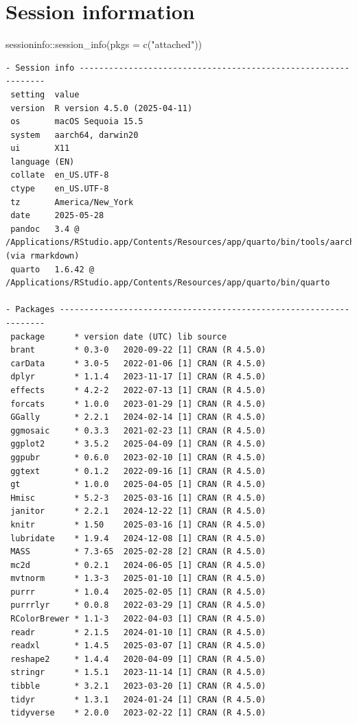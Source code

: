 \documentclass[
  letterpaper,
  DIV=11,
  numbers=noendperiod]{scrartcl}
\newenvironment{Shaded}{\begin{snugshade}}{\end{snugshade}}
\newcommand{\AttributeTok}[1]{\textcolor[rgb]{0.40,0.45,0.13}{#1}}
\newcommand{\FunctionTok}[1]{\textcolor[rgb]{0.28,0.35,0.67}{#1}}
\newcommand{\NormalTok}[1]{\textcolor[rgb]{0.00,0.23,0.31}{#1}}
\newcommand{\SpecialCharTok}[1]{\textcolor[rgb]{0.37,0.37,0.37}{#1}}
\newcommand{\StringTok}[1]{\textcolor[rgb]{0.13,0.47,0.30}{#1}}
\begin{document}
\section*{Session information}\label{session-information}

\begin{Shaded}
\begin{Highlighting}[]
\NormalTok{sessioninfo}\SpecialCharTok{::}\FunctionTok{session\_info}\NormalTok{(}\AttributeTok{pkgs =} \FunctionTok{c}\NormalTok{(}\StringTok{"attached"}\NormalTok{))}
\end{Highlighting}
\end{Shaded}

\begin{verbatim}
- Session info ---------------------------------------------------------------
 setting  value
 version  R version 4.5.0 (2025-04-11)
 os       macOS Sequoia 15.5
 system   aarch64, darwin20
 ui       X11
 language (EN)
 collate  en_US.UTF-8
 ctype    en_US.UTF-8
 tz       America/New_York
 date     2025-05-28
 pandoc   3.4 @ /Applications/RStudio.app/Contents/Resources/app/quarto/bin/tools/aarch64/ (via rmarkdown)
 quarto   1.6.42 @ /Applications/RStudio.app/Contents/Resources/app/quarto/bin/quarto

- Packages -------------------------------------------------------------------
 package      * version date (UTC) lib source
 brant        * 0.3-0   2020-09-22 [1] CRAN (R 4.5.0)
 carData      * 3.0-5   2022-01-06 [1] CRAN (R 4.5.0)
 dplyr        * 1.1.4   2023-11-17 [1] CRAN (R 4.5.0)
 effects      * 4.2-2   2022-07-13 [1] CRAN (R 4.5.0)
 forcats      * 1.0.0   2023-01-29 [1] CRAN (R 4.5.0)
 GGally       * 2.2.1   2024-02-14 [1] CRAN (R 4.5.0)
 ggmosaic     * 0.3.3   2021-02-23 [1] CRAN (R 4.5.0)
 ggplot2      * 3.5.2   2025-04-09 [1] CRAN (R 4.5.0)
 ggpubr       * 0.6.0   2023-02-10 [1] CRAN (R 4.5.0)
 ggtext       * 0.1.2   2022-09-16 [1] CRAN (R 4.5.0)
 gt           * 1.0.0   2025-04-05 [1] CRAN (R 4.5.0)
 Hmisc        * 5.2-3   2025-03-16 [1] CRAN (R 4.5.0)
 janitor      * 2.2.1   2024-12-22 [1] CRAN (R 4.5.0)
 knitr        * 1.50    2025-03-16 [1] CRAN (R 4.5.0)
 lubridate    * 1.9.4   2024-12-08 [1] CRAN (R 4.5.0)
 MASS         * 7.3-65  2025-02-28 [2] CRAN (R 4.5.0)
 mc2d         * 0.2.1   2024-06-05 [1] CRAN (R 4.5.0)
 mvtnorm      * 1.3-3   2025-01-10 [1] CRAN (R 4.5.0)
 purrr        * 1.0.4   2025-02-05 [1] CRAN (R 4.5.0)
 purrrlyr     * 0.0.8   2022-03-29 [1] CRAN (R 4.5.0)
 RColorBrewer * 1.1-3   2022-04-03 [1] CRAN (R 4.5.0)
 readr        * 2.1.5   2024-01-10 [1] CRAN (R 4.5.0)
 readxl       * 1.4.5   2025-03-07 [1] CRAN (R 4.5.0)
 reshape2     * 1.4.4   2020-04-09 [1] CRAN (R 4.5.0)
 stringr      * 1.5.1   2023-11-14 [1] CRAN (R 4.5.0)
 tibble       * 3.2.1   2023-03-20 [1] CRAN (R 4.5.0)
 tidyr        * 1.3.1   2024-01-24 [1] CRAN (R 4.5.0)
 tidyverse    * 2.0.0   2023-02-22 [1] CRAN (R 4.5.0)


\end{verbatim}
\end{document}
